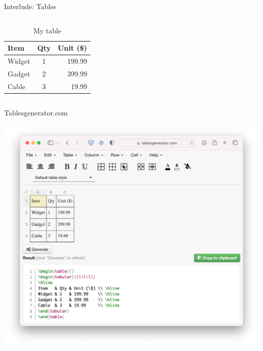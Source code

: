 \documentclass[,aspectratio=43]{beamer}
\newcommand{\VERB}{\Verb[commandchars=\\\{\}]}
\newcommand{\FunctionTok}[1]{\textcolor[rgb]{0.02,0.16,0.49}{#1}}
\begin{document}
\begin{frame}[fragile]{Interlude: Tables}
\begin{columns}[T]
\begin{column}{0.48\textwidth}
\begin{table}[htbp]
\begin{tabular}{|l|c|r|}
\hline
Item   & Qty & Unit (\$) \\ \hline
Widget & 1   & 199.99    \\ \hline
Gadget & 2   & 399.99    \\ \hline
Cable  & 3   & 19.99     \\ \hline
\end{tabular}
\caption{My table}
\label{tab:mytab}
\end{table}
\end{column}
\end{columns}

\vspace{0.5em}

\end{frame}

\begin{frame}{Tablesgenerator.com}
\protect\hypertarget{tablesgenerator.com}{}
\centering

\href{https://www.tablesgenerator.com}{\includegraphics{figure/tablesgenerator.png}}
\end{frame}
\end{document}
